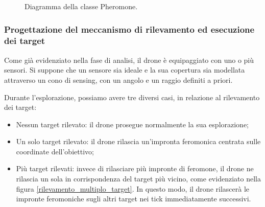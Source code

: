 \begin{figure}[H] 
    \captionsetup{justification=centering, margin=2cm, font=footnotesize}
    \begin{center}
    \end{center}
    \caption{Diagramma della classe Pheromone.}
    \label{classe_pheromone}
\end{figure}

\subsubsection{Progettazione del meccanismo di rilevamento ed esecuzione dei target}

Come già evidenziato nella fase di analisi, il drone è equipaggiato con uno o più sensori. 
Si suppone che un sensore sia ideale e la sua copertura sia modellata attraverso un cono di sensing, con un angolo e un raggio definiti a priori.

Durante l’esplorazione, possiamo avere tre diversi casi, in relazione al rilevamento dei target:
\begin {itemize}
	\item Nessun target rilevato: il drone prosegue normalmente la sua esplorazione;
	\item Un solo target rilevato: il drone rilascia un’impronta feromonica centrata sulle coordinate dell’obiettivo;
	\item Più target rilevati: invece di rilasciare più impronte di feromone, il drone ne rilascia un sola in corrispondenza del target più vicino, come evidenziato nella figura \ref{rilevamento_multiplo_target}.
	In questo modo, il drone rilascerà le impronte feromoniche sugli altri target nei tick immediatamente successivi.
\end{itemize}

